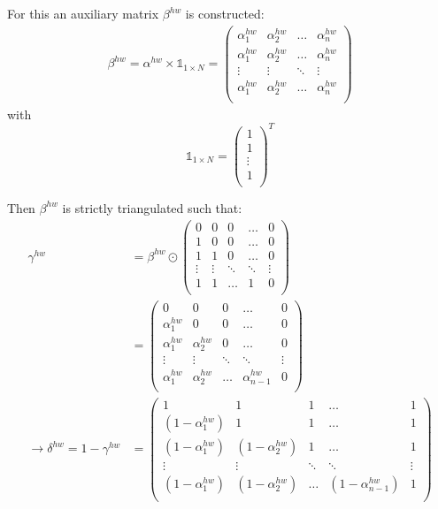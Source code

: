 For this an auxiliary matrix $\beta^{hw}$ is constructed:
\begin{align}
    \beta^{hw} = \alpha^{hw} \times \mathbb{1}_{1 \times N} = 
    \begin{pmatrix}
        \alpha^{hw}_1 & \alpha^{hw}_2 & \hdots & \alpha^{hw}_n\\
        \alpha^{hw}_1 & \alpha^{hw}_2 & \hdots & \alpha^{hw}_n\\
        \vdots & \vdots & \ddots & \vdots \\
        \alpha^{hw}_1 & \alpha^{hw}_2 & \hdots & \alpha^{hw}_n\\
    \end{pmatrix}
\end{align}
with
$$
\mathbb{1}_{1 \times N} = \begin{pmatrix}
        1 \\
        1 \\
        \vdots\\
        1 \\
    \end{pmatrix}^T
$$

Then $\beta^{hw}$ is strictly triangulated such that:
\begin{align}
    \gamma^{hw} & = \beta^{hw} \odot
    \begin{pmatrix}
        0 & 0 & 0 &\hdots & 0\\
        1 & 0 & 0 &\hdots & 0\\
        1 & 1 & 0 &\hdots & 0\\
        \vdots & \vdots & \ddots & \ddots & \vdots \\
        1 & 1 & \hdots & 1 & 0\\
    \end{pmatrix}
    \\ & = 
    \begin{pmatrix}
        0 & 0 & 0 & \hdots & 0\\
        \alpha^{hw}_1 & 0 & 0 & \hdots & 0\\
        \alpha^{hw}_1 & \alpha^{hw}_2 & 0 & \hdots & 0\\
        \vdots & \vdots & \ddots & \ddots & \vdots \\
        \alpha^{hw}_1 & \alpha^{hw}_2 & \hdots & \alpha^{hw}_{n-1} & 0\\
    \end{pmatrix}
    \\
    \rightarrow \delta^{hw} = 1 - \gamma^{hw} & = 
    \begin{pmatrix}
        1 & 1 & 1 & \hdots & 1\\
        (1 - \alpha^{hw}_1) & 1 & 1 & \hdots & 1\\
        (1 - \alpha^{hw}_1) & (1 - \alpha^{hw}_2) & 1 & \hdots & 1\\
        \vdots & \vdots & \ddots & \ddots & \vdots \\
        (1 - \alpha^{hw}_1) & (1 - \alpha^{hw}_2) & \hdots & (1 - \alpha^{hw}_{n-1}) & 1\\
    \end{pmatrix}
\end{align}


